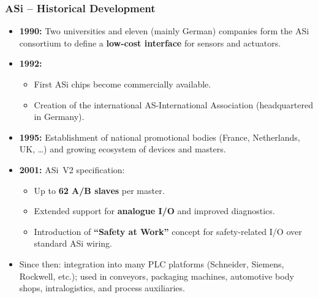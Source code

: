 \begin{frame}
	\frametitle{ASi -- Historical Development}
	\begin{itemize}
		\item \textbf{1990:} Two universities and eleven (mainly German) companies form the ASi consortium
			to define a \textbf{low-cost interface} for sensors and actuators.
		\item \textbf{1992:}
		\begin{itemize}
			\item First ASi chips become commercially available.
			\item Creation of the international AS-International Association (headquartered in Germany).
		\end{itemize}
		\item \textbf{1995:} Establishment of national promotional bodies (France, Netherlands, UK, \dots)
			and growing ecosystem of devices and masters.
		\item \textbf{2001:} ASi~V2 specification:
		\begin{itemize}
			\item Up to \textbf{62 A/B slaves} per master.
			\item Extended support for \textbf{analogue I/O} and improved diagnostics.
			\item Introduction of \textbf{“Safety at Work”} concept for safety-related I/O over standard ASi wiring.
		\end{itemize}
		\item Since then: integration into many PLC platforms (Schneider, Siemens, Rockwell, etc.);
			used in conveyors, packaging machines, automotive body shops, intralogistics, and process auxiliaries.
	\end{itemize}
\end{frame}

